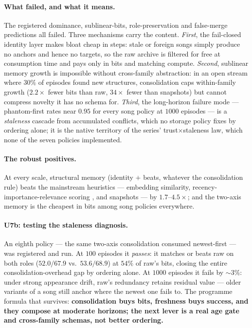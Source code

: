 \documentclass{article}
\begin{document}
\paragraph{What failed, and what it means.} The registered dominance,
sublinear-bits, role-preservation and false-merge predictions all
failed. Three mechanisms carry the content. \emph{First}, the
fail-closed identity layer makes bloat cheap in steps: stale or
foreign songs simply produce no anchors and hence no targets, so the
raw archive is filtered for free at consumption time and pays only in
bits and matching compute. \emph{Second}, sublinear memory growth is
impossible without cross-family abstraction: in an open stream where
$30\%$ of episodes found new structures, consolidation caps
within-family growth ($2.2\times$ fewer bits than raw, $34\times$
fewer than snapshots) but cannot compress novelty it has no schema
for. \emph{Third}, the long-horizon failure mode --- phantom-first
rates near $0.95$ for every song policy at $1000$ episodes --- is a
\emph{staleness} cascade from accumulated conflicts, which no storage
policy fixes by ordering alone; it is the native territory of the
series' trust$\times$staleness law, which none of the seven policies
implemented.

\paragraph{The robust positives.} At every scale, structural memory
(identity $+$ beats, whatever the consolidation rule) beats the
mainstream heuristics --- embedding similarity, recency-importance-relevance
scoring \citep{genagents2023,memgas2025}, and snapshots --- by
$1.7$--$4.5\times$; and the two-axis memory is the cheapest in bits
among song policies everywhere.

\paragraph{U7b: testing the staleness diagnosis.} An eighth policy
--- the same two-axis consolidation consumed newest-first --- was
registered and run. At $100$ episodes it \emph{passes}: it matches or
beats raw on both roles ($52.0/67.9$ vs.\ $53.6/68.9$) at $54\%$ of
raw's bits, closing the entire consolidation-overhead gap by
ordering alone. At $1000$ episodes it fails by $\sim 3\%$: under
strong appearance drift, raw's redundancy retains residual value ---
older variants of a song still anchor where the newest one fails to.
The programme formula that survives: \textbf{consolidation buys bits,
freshness buys success, and they compose at moderate horizons; the
next lever is a real age gate and cross-family schemas, not better
ordering.}
\end{document}
